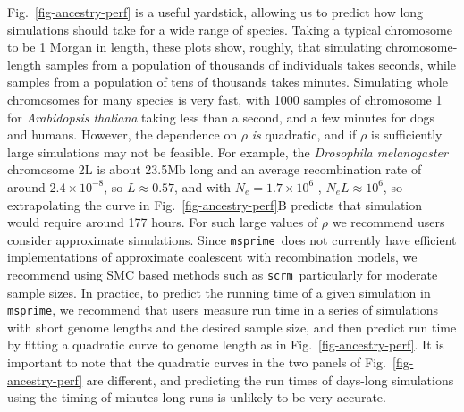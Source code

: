 \documentclass{article}
\newcommand{\msprime}[0]{\texttt{msprime}}
\newcommand{\scrm}[0]{\texttt{scrm}}
\begin{document}
Fig.~\ref{fig-ancestry-perf} is a useful yardstick, allowing us
to predict how long simulations should take for a wide range of
species. Taking a typical chromosome to be 1 Morgan in length,
these plots show, roughly, that simulating chromosome-length
samples from a population of thousands of individuals takes seconds,
while samples from a population of tens of thousands takes minutes.
Simulating whole chromosomes for many species is very fast,
with 1000 samples of chromosome 1 for
\emph{Arabidopsis thaliana} taking less than a second, and a few
minutes for dogs and humans. However, the dependence on $\rho$
\emph{is} quadratic, and if $\rho$ is sufficiently large simulations
may not be feasible. For example,
the \emph{Drosophila melanogaster} chromosome 2L
is about 23.5Mb long and an average recombination rate of around $2.4 \times 10^{-8}$,
so $L \approx 0.57$,
and with $N_e = 1.7 \times 10^6$ \citep{li2006inferring},
$N_e L \approx 10^6$, so extrapolating the curve in Fig.~\ref{fig-ancestry-perf}B
predicts that simulation would require around 177 hours.
For such large values of $\rho$  we recommend
users consider approximate simulations. Since \msprime\ does not currently
have efficient implementations of approximate coalescent with recombination
models, we recommend using SMC based methods such as \scrm\,
particularly for moderate sample sizes.
In practice, to predict the running time of a given
simulation in \msprime, we recommend that users
measure run time in a series of simulations with short genome lengths and
the desired sample size,
and then predict run time by fitting a quadratic curve to genome length
as in Fig.~\ref{fig-ancestry-perf}.
It is important to note that the quadratic curves in the two
panels of Fig.~\ref{fig-ancestry-perf} are different, and
predicting the run times of days-long simulations
using the timing of minutes-long runs is unlikely to be very accurate.
\end{document}
